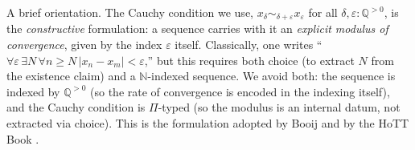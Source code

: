 \documentclass[12pt]{article}
\theoremstyle{definition}
\theoremstyle{remark}
\newcommand{\N}{\mathbb{N}}
\newcommand{\Q}{\mathbb{Q}}
\newcommand{\close}{\mathrel{\sim}}
\begin{document}
A brief orientation. The Cauchy condition we use,
$x_{\delta} \close_{\delta + \varepsilon} x_{\varepsilon}$ for all
$\delta, \varepsilon : \Q^{>0}$, is the
\emph{constructive} formulation: a sequence carries with it an
\emph{explicit modulus of convergence}, given by the index
$\varepsilon$ itself. Classically, one writes
``$\forall \varepsilon\,\exists N\,\forall n \geq N\,|x_n - x_m| <
\varepsilon$,'' but this requires both choice (to extract $N$ from the
existence claim) and a $\N$-indexed sequence. We avoid both: the
sequence is indexed by $\Q^{>0}$ (so the rate of convergence is
encoded in the indexing itself), and the Cauchy condition is
$\Pi$-typed (so the modulus is an internal datum, not extracted via
choice). This is the formulation adopted by Booij
\cite{Booij2020} and by the HoTT Book
\cite[\S 11.3]{HoTTBook}.
\end{document}
